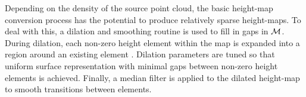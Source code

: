 			Depending on the density of the source point cloud, the basic height-map conversion process has the potential to produce relatively sparse height-maps. To deal with this, a dilation and smoothing routine is used to fill in gaps in ${\cal M}$. During dilation, each non-zero height element within the map is expanded into a region around an existing element \cite{opencv_learn_immorph}. Dilation parameters are tuned so that uniform surface representation with minimal gaps between non-zero height elements is achieved. Finally, a median filter is applied to the dilated height-map to smooth transitions between elements.

